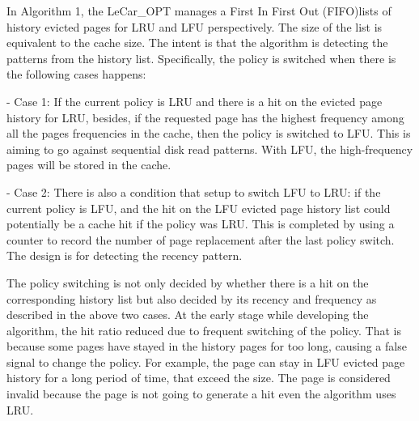 \documentclass[letterpaper,twocolumn,10pt]{article}
\begin{document}
In Algorithm 1, the LeCar\_OPT manages a First In First Out (FIFO)lists of history evicted pages for LRU and LFU perspectively. The size of the list is equivalent to the cache size. The intent is that the algorithm is detecting the patterns from the history list. Specifically, the policy is switched when there is the following cases happens: 


- Case 1: If the current policy is LRU and there is a hit on the evicted page history for LRU, besides, if the requested page has the highest frequency among all the pages frequencies in the cache, then the policy is switched to LFU. This is aiming to go against sequential disk read patterns. With LFU, the high-frequency pages will be stored in the cache. 


- Case 2: There is also a condition that setup to switch LFU to LRU: if the current policy is LFU, and the hit on the LFU evicted page history list could potentially be a cache hit if the policy was LRU. This is completed by using a counter to record the number of page replacement after the last policy switch. The design is for detecting the recency pattern.

The policy switching is not only decided by whether there is a hit on the corresponding history list but also decided by its recency and frequency as described in the above two cases. At the early stage while developing the algorithm, the hit ratio reduced due to frequent switching of the policy. That is because some pages have stayed in the history pages for too long, causing a false signal to change the policy. For example, the page can stay in LFU evicted page history for a long period of time, that exceed the size. The page is considered invalid because the page is not going to generate a hit even the algorithm uses LRU. 
\end{document}
